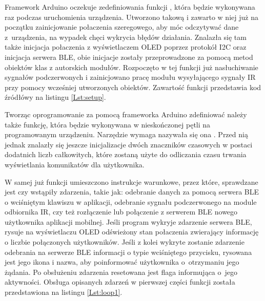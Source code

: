 \documentclass[12pt,twoside]{article}
\begin{document}


Framework Arduino oczekuje zedefiniowania funkcji , która będzie wykonywana raz podczas uruchomienia urządzenia. Utworzono takową i zawarto w niej już na początku zainicjowanie połaczenia szeregowego, aby móc odczytywać dane z~urządzenia, na wypadek chęci wykrycia błędów działania. Znalazła się tam także inicjacja połaczenia z wyświetlaczem OLED poprzez protokół I2C oraz inicjacja serwera BLE, obie inicjacje zostały przeprowadzone za pomocą metod obiektów klas z autorskich modułów. Rozpoczęto w tej funkcji już nasłuchiwanie sygnałów podczerwonych i zainicjowano pracę modułu wysyłającego sygnały IR przy pomocy wcześniej utworzonych obiektów. Zawartość funkcji  przedstawia kod źródłówy na listingu \ref*{Lst:setup}.



Tworząc oprogramowanie za pomocą frameworka Arduino zdefiniować należy także funkcję, która będzie wykonywana w nieskończonej pętli na programowanym urządzeniu. Narzędzie wymaga nazywała się ona . Przed nią jednak znalazły się jeszcze inicjalizacje dwóch znaczników czasowych w postaci dodatnich liczb całkowitych, które zostaną użyte do odliczania czasu trwania wyświetlania komunikatów dla użytkownika.

\begin{figure}[!ht]
  
\end{figure}

W samej już funkcji umieszczono instrukcje warunkowe, przez które, sprawdzane jest czy wstąpiły zdarzenia, takie jak: odebranie danych za pomocą serwera BLE o wciśniętym klawiszu w aplikacji, odebranie sygnału podczerwonego na module odbiornika IR, czy też rozłączenie lub połączenie z serwerem BLE nowego użytkownika aplikacji mobilnej. Jeśli program wykryje zdarzenie serwera BLE, rysuje na wyświetlaczu OLED odświeżony stan połaczenia zwierający informację o liczbie połączonych użytkowników. Jeśli z kolei wykryte zostanie zdarzenie odebrania na serwerze BLE informacji o typie wciśniętego przycisku, rysowana jest jego ikona i nazwa, aby poinformować użytkownika o~otrzymaniu jego żądania. Po obsłużeniu zdarzenia resetowana jest flaga informująca o~jego aktywności. Obsługa opisanych zdarzeń w pierwszej części funkcji  została przedstawiona na listingu \ref*{Lst:loop1}.
\end{document}
